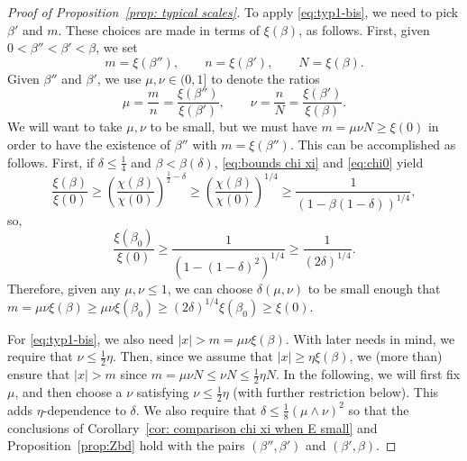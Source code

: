 \documentclass[11pt,a4paper]{article}
\numberwithin{equation}{section}
\theoremstyle{plain}
\theoremstyle{definition}
\newcommand\1{\mathds{1}}
\begin{document}
\begin{proof}[Proof of Proposition~\textup{\ref{prop: typical scales}}]
To apply \eqref{eq:typ1-bis}, we need to pick $\beta'$ and $m$.
These choices are made in terms of $\xi(\beta)$, as follows.
First, given $0 < \beta'' < \beta' < \beta$, we set
\begin{equation}
    m = \xi(\beta''), \qquad n = \xi(\beta'), \qquad N = \xi(\beta).
\end{equation}
Given $\beta''$ and $\beta'$, we use $\mu,\nu\in (0,1]$ to denote the ratios
\begin{equation}
    \mu = \frac mn =\frac{\xi(\beta'')}{\xi(\beta')}, \qquad
    \nu = \frac nN = \frac{\xi(\beta')}{\xi(\beta)}.
\end{equation}
We will want to take $\mu,\nu$ to be small, but we must have
$m = \mu\nu N \ge \xi(0)$ in order to have the existence of $\beta''$
with $m=\xi(\beta'')$.
This can be accomplished as follows.
First, if $\delta\leq \tfrac{1}{4}$ and $\beta< \beta(\delta)$, \eqref{eq:bounds chi xi} and \eqref{eq:chi0} yield
\begin{equation}
\label{eq:typ8}
    \frac{\xi(\beta)}{\xi(0)} \ge \left(\frac{\chi(\beta)}{\chi(0)}\right)^{\tfrac{1}{2}-\delta}  \ge\left( \frac{\chi(\beta)}{\chi(0)} \right)^{1/4}
    \ge \frac{1}{(1-\beta(1-\delta) )^{1/4}},
\end{equation}
so,
\begin{equation}
    \frac{\xi(\beta_0)}{\xi(0)}
    \ge \frac{1}{(1-(1-\delta)^2 )^{1/4}}
        \ge
    \frac{1}{(2\delta)^{1/4}}
    .
\end{equation}
Therefore, given any $\mu,\nu \le 1$,
we can choose $\delta(\mu,\nu)$ to be small enough that
$m=\mu\nu \xi(\beta) \ge \mu\nu \xi(\beta_0)  \ge (2\delta)^{1/4}\xi(\beta_0)\geq \xi(0)$.

For \eqref{eq:typ1-bis}, we also need $|x| >m = \mu\nu \xi(\beta)$.
With later needs in mind, we require that $\nu \le \frac 12 \eta$.
Then, since we assume that $|x|\ge \eta \xi(\beta)$,
we (more than) ensure that
$|x|>m$ since $m=\mu\nu N \le \nu N \le \frac 12 \eta N$.  In the following,
we will first fix $\mu$, and then choose a $\nu$ satisfying $\nu \le \frac 12 \eta$
(with further restriction below).
This adds $\eta$-dependence to $\delta$. We also require that $\delta\leq \tfrac{1}{8}(\mu\wedge \nu)^{2}$ so that the conclusions of Corollary~\ref{cor: comparison chi xi when E small} and Proposition~\ref{prop:Zbd}
hold with the pairs $(\beta'',\beta')$ and $(\beta',\beta)$.


\end{proof}
\end{document}
